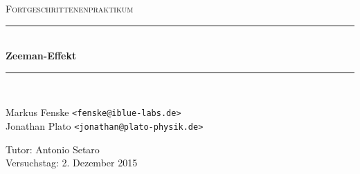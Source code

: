 \newcommand{\HRule}{\rule{\linewidth}{0.5mm}}

\begin{center}
  \textsc{\Large Fortgeschrittenenpraktikum}
  \HRule\\[0.4 cm]
  {\huge \bfseries Zeeman-Effekt}
  \HRule\\[0.4 cm]

  \begin{minipage}{0.60\textwidth}
  \begin{flushleft}
    Markus Fenske \texttt{<fenske@iblue-labs.de>} \\
    Jonathan Plato \texttt{<jonathan@plato-physik.de>}
  \end{flushleft}
  \end{minipage}
  \hfill
  \begin{minipage}{0.35\textwidth}
  \begin{flushright}
    Tutor: Antonio Setaro \\
    Versuchstag: 2. Dezember 2015
  \end{flushright}
  \end{minipage}

  \vspace{1cm}

  \tableofcontents


  \vfill
\end{center}
\newpage
